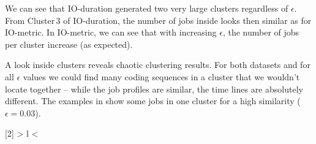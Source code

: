 \documentclass{jhps}
\begin{document}
We can see that IO-duration generated two very large clusters regardless of $\epsilon$.
From Cluster\,3 of IO-duration, the number of jobs inside looks then similar as for IO-metric.
In IO-metric, we can see that with increasing $\epsilon$, the number of jobs per cluster increase (as expected).

A look inside clusters reveals chaotic clustering results.
For both datasets and for all $\epsilon$ values we could find many coding sequences in a cluster that we wouldn't locate together -- while the job profiles are similar, the time lines are absolutely different.
The examples in  show some jobs in one cluster for a high similarity ($\epsilon = 0.03$).

\def\rd{3}
\newcolumntype{R}[2]{%
    >{\bgroup}%
    l%
    <{\egroup}%
}
\newcommand*\rot{\multicolumn{1}{R{30}{1em}}}%
\end{document}
